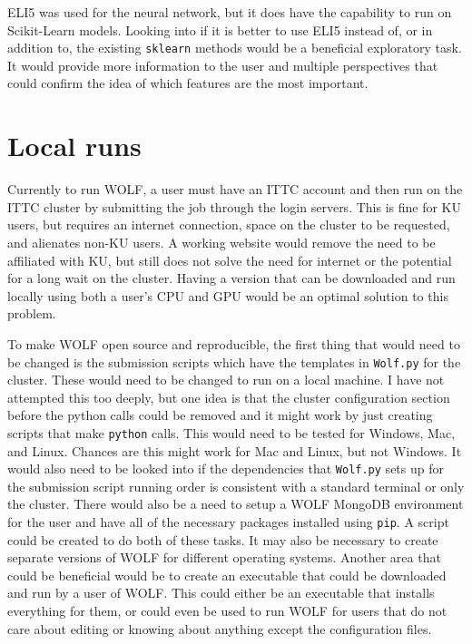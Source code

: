 ELI5 was used for the neural network, but it does have the capability to run on Scikit-Learn models. Looking into if it is better to use ELI5 instead of, or in addition to, the existing {\tt sklearn} methods would be a beneficial exploratory task. It would provide more information to the user and multiple perspectives that could confirm the idea of which features are the most important.

\section*{Local runs}
Currently to run WOLF, a user must have an ITTC account and then run on the ITTC cluster by submitting the job through the login servers. This is fine for KU users, but requires an internet connection, space on the cluster to be requested, and alienates non-KU users. A working website would remove the need to be affiliated with KU, but still does not solve the need for internet or the potential for a long wait on the cluster. Having a version that can be downloaded and run locally using both a user's CPU and GPU would be an optimal solution to this problem.

To make WOLF open source and reproducible, the first thing that would need to be changed is the submission scripts which have the templates in {\tt Wolf.py} for the cluster. These would need to be changed to run on a local machine. I have not attempted this too deeply, but one idea is that the cluster configuration section before the python calls could be removed and it might work by just creating scripts that make {\tt python} calls. This would need to be tested for Windows, Mac, and Linux. Chances are this might work for Mac and Linux, but not Windows. It would also need to be looked into if the dependencies that {\tt Wolf.py} sets up for the submission script running order is consistent with a standard terminal or only the cluster. There would also be a need to setup a WOLF MongoDB environment for the user and have all of the necessary packages installed using {\tt pip}. A script could be created to do both of these tasks. It may also be necessary to create separate versions of WOLF for different operating systems. Another area that could be beneficial would be to create an executable that could be downloaded and run by a user of WOLF. This could either be an executable that installs everything for them, or could even be used to run WOLF for users that do not care about editing or knowing about anything except the configuration files.

